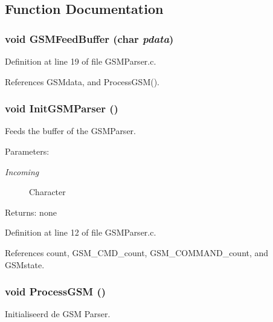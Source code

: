 \subsection{Function Documentation}
\subsubsection{\setlength{\rightskip}{0pt plus 5cm}void GSMFeedBuffer (char {\em pdata})}\label{_g_s_m_parser_8h_afe2bd5505a916da6c8b945dd30f1f7b}




Definition at line 19 of file GSMParser.c.

References GSMdata, and ProcessGSM().
\subsubsection{\setlength{\rightskip}{0pt plus 5cm}void InitGSMParser ()}\label{_g_s_m_parser_8h_2d76fb153afd5a39bd0e362f9268103b}


Feeds the buffer of the GSMParser. 

\begin{Desc}
\item[Parameters:]
\begin{description}
\item[{\em Incoming}]Character \end{description}
\end{Desc}
\begin{Desc}
\item[Returns:]none \end{Desc}


Definition at line 12 of file GSMParser.c.

References count, GSM\_\-CMD\_\-count, GSM\_\-COMMAND\_\-count, and GSMstate.
\subsubsection{\setlength{\rightskip}{0pt plus 5cm}void ProcessGSM ()}\label{_g_s_m_parser_8h_874ee7f889281e115898b3ac58bf7c13}


Initialiseerd de GSM Parser. 

